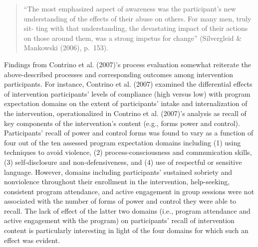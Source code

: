 \documentclass[11pt,]{tufte-book}
\begin{document}
\begin{quote}
``The most emphasized aspect of awareness was the participant's new
understanding of the effects of their abuse on others. For many men,
truly sit- ting with that understanding, the devastating impact of their
actions on those around them, was a strong impetus for change''
(Silvergleid \& Mankowski (2006), p.~153).
\end{quote}

Findings from Contrino et al. (2007)'s process evaluation somewhat
reiterate the above-described processes and corresponding outcomes among
intervention participants. For instance, Contrino et al. (2007) examined
the differential effects of intervention participants' levels of
compliance (high versus low) with program expectation domains on the
extent of participants' intake and internalization of the intervention,
operationalized in Contrino et al. (2007)'s analysis as recall of key
components of the intervention's content (e.g., forms power and
control). Participants' recall of power and control forms was found to
vary as a function of four out of the ten assessed program expectation
domains including (1) using techniques to avoid violence, (2)
process-consciousness and communication skills, (3) self-disclosure and
non-defensiveness, and (4) use of respectful or sensitive language.
However, domains including participants' sustained sobriety and
nonviolence throughout their enrollment in the intervention,
help-seeking, consistent program attendance, and active engagement in
group sessions were not associated with the number of forms of power and
control they were able to recall. The lack of effect of the latter two
domains (i.e., program attendance and active engagement with the
program) on participants' recall of intervention content is particularly
interesting in light of the four domains for which such an effect was
evident.
\end{document}
